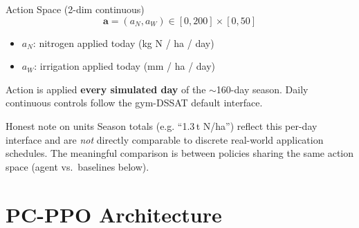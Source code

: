 \documentclass[10pt,aspectratio=169]{beamer}
\newcommand{\aten}{\mathbf{a}}
\newcommand{\strong}[1]{\textbf{\textcolor{cAccent}{#1}}}
\begin{document}
\begin{frame}{Action Space (2-dim continuous)}
  \[
    \aten = (a_N, a_W) \in [0, 200] \times [0, 50]
  \]
  \begin{itemize}
    \item $a_N$: nitrogen applied today (kg N / ha / day)
    \item $a_W$: irrigation applied today (mm / ha / day)
  \end{itemize}

  \vspace{0.8em}
  Action is applied \strong{every simulated day} of the $\sim$160-day season.
  Daily continuous controls follow the gym-DSSAT default interface.

  \vspace{0.8em}
  \begin{alertblock}{Honest note on units}
    Season totals (e.g. ``1.3\,t N/ha'') reflect this per-day interface and
    are \emph{not} directly comparable to discrete real-world application schedules.
    The meaningful comparison is between policies sharing the same action space
    (agent vs.\ baselines below).
  \end{alertblock}
\end{frame}

\section{PC-PPO Architecture}
\end{document}
